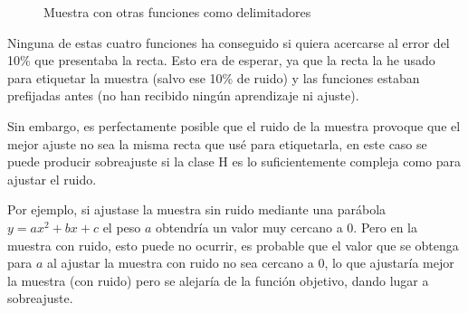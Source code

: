 \documentclass[a4]{article}
\begin{document}
\begin{figure}[H]
    
    \caption{Muestra con otras funciones como delimitadores}
    \label{fig:muestra-otras}
\end{figure}

\vspace{-3mm}

Ninguna de estas cuatro funciones ha conseguido si quiera acercarse
al error del 10\% que presentaba la recta. Esto era de esperar,
ya que la recta la he usado para etiquetar la muestra (salvo ese 10\% de ruido)
y las funciones estaban prefijadas antes (no han recibido ningún aprendizaje ni ajuste).

Sin embargo, es perfectamente posible que el ruido de la muestra
provoque que el mejor ajuste no sea la misma recta que usé
para etiquetarla, en este caso se puede producir sobreajuste
si la clase H es lo suficientemente compleja como para ajustar el
ruido.

Por ejemplo, si ajustase la muestra sin ruido mediante
una parábola $y=ax^2+bx+c$ el peso $a$ obtendría un valor muy cercano a 0.
Pero en la muestra con ruido, esto puede no ocurrir, es probable
que el valor que se obtenga para $a$ al ajustar la muestra con
ruido no sea cercano a 0, lo que ajustaría mejor la muestra (con ruido)
pero se alejaría de la función objetivo, dando lugar a sobreajuste.
\end{document}
